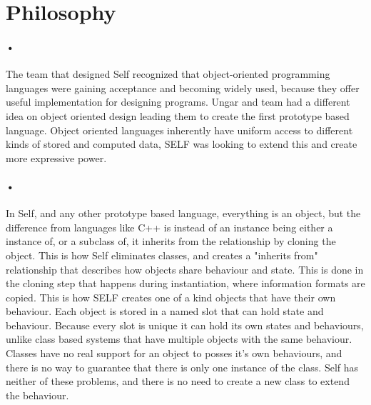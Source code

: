 \documentclass[12pt]{article}
\begin{document}
\section{Philosophy}
\paragraph{•} The team that designed Self recognized that object-oriented programming languages were gaining acceptance and becoming widely used, because they offer useful implementation for designing programs. Ungar and team had a different idea on object oriented design leading them to create the first prototype based language. Object oriented languages inherently have uniform access to different kinds of stored and computed data, SELF was looking to extend this and create more expressive power. \cite{power}

\paragraph{•} In Self, and any other prototype based language, everything is an object, but the difference from languages like C++ is instead of an instance being either a instance of, or a subclass of, it inherits from the relationship by cloning the object. This is how Self eliminates classes, and creates a "inherits from" relationship that describes how objects share behaviour and state. This is done in the cloning step that happens during instantiation, where information formats are copied. This is how SELF creates one of a kind objects that have their own behaviour. Each object is stored in a named slot that can hold state and behaviour. Because every slot is unique it can hold its own states and behaviours, unlike class based systems that have multiple objects with the same behaviour. Classes have no real support for an object to posses it's own behaviours, and there is no way to guarantee that there is only one instance of the class. Self has neither of these problems, and there is no need to create a new class to extend the behaviour. \cite{power}
\end{document}
